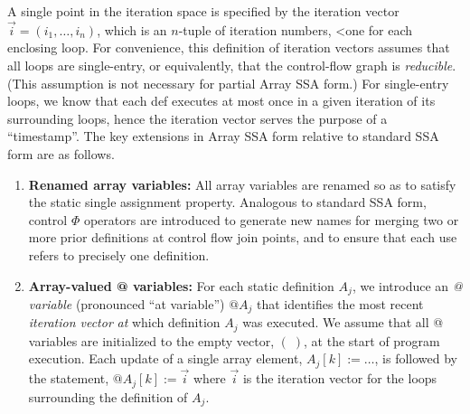 A single point in the
iteration space is specified by the iteration vector
$\vec{i} = (i_1, \ldots, i_n)$, which is
an 
$n$-tuple of iteration numbers,
<one for each enclosing loop. 
For convenience, this definition of iteration vectors assumes that  
all loops are single-entry, or equivalently, that the control-flow graph is {\it reducible}.
(This assumption is not necessary
for partial Array SSA form.)
For single-entry loops, we know that each def executes at most
once in a given iteration of its surrounding loops, hence the iteration vector
serves the purpose of a ``timestamp''.
The key extensions in Array SSA form relative to standard SSA form are as
follows.



\begin{enumerate}
\item {\bf Renamed array variables:}
All array variables are renamed so as to 
satisfy the static single assignment property.  Analogous to standard SSA
form, control $\Phi$ operators are introduced to generate new names
for merging two or more prior definitions at control flow join points, and to ensure that each use
refers to precisely one definition.

\item {\bf Array-valued @ variables:}
For each static definition
$A_j$, we introduce an {\em @ variable} (pronounced ``at variable'')
$@A_j$ that identifies
the most recent {\em iteration vector} {\it
at} which definition $A_j$ was executed.
We assume that all @ variables are initialized to the empty
vector, $ (\;)$, at the start of program execution.  
Each update of a single array element, $A_j[k] := \ldots$, 
is followed by the statement, $@A_j[k] := \vec{i}$
where $\vec{i}$ is the iteration vector for the loops surrounding
the definition of $A_j$.



\end{enumerate}

